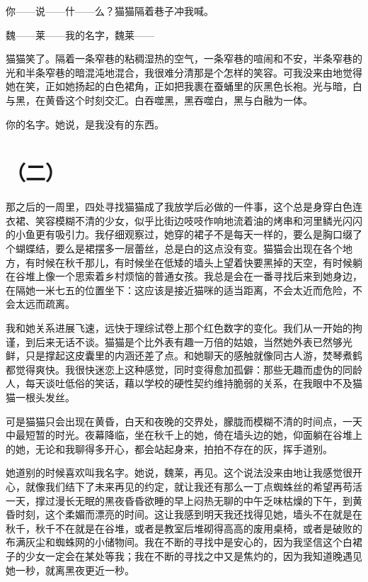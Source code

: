 \documentclass{article}
\begin{document}
你——说——什——么？猫猫隔着巷子冲我喊。



魏——莱——我的名字，魏莱——



猫猫笑了。隔着一条窄巷的粘稠湿热的空气，一条窄巷的喧闹和不安，半条窄巷的光和半条窄巷的暗混沌地混合，我很难分清那是个怎样的笑容。可我没来由地觉得她在笑，正如她扬起的白色裙角，正如把我裹在蚕蛹里的灰黑色长袍。光与暗，白与黑，在黄昏这个时刻交汇。白吞噬黑，黑吞噬白，黑与白融为一体。



你的名字。她说，是我没有的东西。





{\centering\section*{（二）}}





那之后的一周里，四处寻找猫猫成了我放学后必做的一件事，这个总是身穿白色连衣裙、笑容模糊不清的少女，似乎比街边吱吱作响地流着油的烤串和河里鳞光闪闪的小鱼更有吸引力。我仔细观察过，她穿的裙子不是每天一样的，要么是胸口缀了个蝴蝶结，要么是裙摆多一层蕾丝，总是白的这点没有变。猫猫会出现在各个地方，有时候在秋千那儿，有时候坐在低矮的墙头上望着快要黑掉的天空，有时候躺在谷堆上像一个思索着乡村烦恼的普通女孩。我总是会在一番寻找后来到她身边，在隔她一米七五的位置坐下：这应该是接近猫咪的适当距离，不会太近而危险，不会太远而疏离。



我和她关系进展飞速，远快于理综试卷上那个红色数字的变化。我们从一开始的拘谨，到后来无话不谈。猫猫是个比外表有趣一万倍的姑娘，当然她外表已然够光鲜，只是撑起这皮囊里的内涵还差了点。和她聊天的感触就像同古人游，焚琴煮鹤都觉得爽快。我很快迷恋上这种感觉，同时变得愈加孤僻：那些无趣而虚伪的同龄人，每天谈吐低俗的笑话，藉以学校的硬性契约维持脆弱的关系，在我眼中不及猫猫一根头发丝。



可是猫猫只会出现在黄昏，白天和夜晚的交界处，朦胧而模糊不清的时间点，一天中最短暂的时光。夜幕降临，坐在秋千上的她，倚在墙头边的她，仰面躺在谷堆上的她，无论和我聊得多开心，都会站起身来，拍拍不存在的灰，挥手道别。



她道别的时候喜欢叫我名字。她说，魏莱，再见。这个说法没来由地让我感觉很开心，就像我们结下了未来再见的约定，就让我还有那么一丁点蜘蛛丝的希望再苟活一天，撑过漫长无眠的黑夜昏昏欲睡的早上闷热无聊的中午乏味枯燥的下午，到黄昏时刻，这个柔媚而漂亮的时间。这让我感到明天我还找得见她，墙头不在就是在秋千，秋千不在就是在谷堆，或者是教室后堆砌得高高的废用桌椅，或者是破败的布满灰尘和蜘蛛网的小储物间。我在不断的寻找中是安心的，因为我坚信这个白裙子的少女一定会在某处等我；我在不断的寻找之中又是焦灼的，因为我知道晚遇见她一秒，就离黑夜更近一秒。
\end{document}
